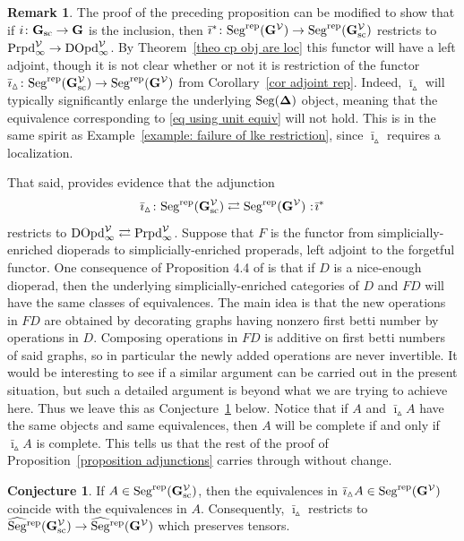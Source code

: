 \documentclass{amsart}
\numberwithin{theorem}{subsection}
\theoremstyle{definition}
\newtheorem{conj}[theorem]{Conjecture}
\newtheorem{remark}[theorem]{Remark}
\newcommand{\xV}{\mathcal{V}}
\newcommand*\cocolon{%
	\nobreak
	\mskip6mu plus1mu
	\mathpunct{}%
	\nonscript
	\mkern-\thinmuskip
	{:}%
	\mskip2mu
	\relax
}
\newcommand{\name}[1]{\ensuremath{\text{\textup{#1}}}}
\newcommand{\simp}{\mathbf{\Delta}}
\newcommand{\bbY}{\mathbf{G}}
\newcommand{\bbYV}{\bbY^{\xV}}
\newcommand{\barinotshriek}{\bar \imath_\vartriangle}
\newcommand{\bariustar}{\bar \imath^*}
\newcommand{\Seg}{\name{Seg}}
\newcommand{\Segrep}{\Seg^{\name{rep}}}
\newcommand{\Segrepc}{\widehat{\Seg}\vphantom{\Seg}^{\name{rep}}}
\newcommand{\nmproperad}{\name{Prpd}}
\begin{document}
\begin{remark}
The proof of the preceding proposition can be modified to show that if $i \colon \bbY_{\name{sc}} \to \bbY$ is the inclusion, then $\bariustar \colon \Segrep(\bbYV) \to \Segrep(\bbYV_{\name{sc}})$ restricts to $\nmproperad_\infty^\xV \to \name{DOpd}^\xV_\infty$.
By Theorem~\ref{theo cp obj are loc} this functor will have a left adjoint, though it is not clear whether or not it is restriction of the functor $\barinotshriek \colon \Segrep(\bbYV_{\name{sc}}) \to \Segrep(\bbYV)$ from Corollary~\ref{cor adjoint rep}.
Indeed, $\barinotshriek$ will typically significantly enlarge the underlying $\Seg(\simp)$ object, meaning that the equivalence corresponding to \eqref{eq using unit equiv} will not hold.
This is in the same spirit as Example~\ref{example: failure of lke restriction}, since $\barinotshriek$ requires a localization. 

That said, \cite[\S4]{HackneyRobertsonYau:SMIP} provides evidence that the adjunction \[ \barinotshriek \colon \Segrep(\bbYV_{\name{sc}}) \rightleftarrows \Segrep(\bbYV) \cocolon \bariustar\] restricts to $\name{DOpd}^\xV_\infty \rightleftarrows \nmproperad_\infty^\xV$.
Suppose that $F$ is the functor from simplicially-enriched dioperads to simplicially-enriched properads, left adjoint to the forgetful functor.
One consequence of Proposition 4.4 of \cite{HackneyRobertsonYau:SMIP} is that if $D$ is a nice-enough dioperad, then the underlying simplicially-enriched categories of $D$ and $FD$ will have the same classes of equivalences.
The main idea is that the new operations in $FD$ are obtained by decorating graphs having nonzero first betti number by operations in $D$.
Composing operations in $FD$ is additive on first betti numbers of said graphs, so in particular the newly added operations are never invertible.
It would be interesting to see if a similar argument can be carried out in the present situation, but such a detailed argument is beyond what we are trying to achieve here.
Thus we leave this as Conjecture~\ref{conjecture equivalences} below.
Notice that if $A$ and $\barinotshriek A$ have the same objects and same equivalences, then $A$ will be complete if and only if $\barinotshriek A$ is complete.
This tells us that the rest of the proof of Proposition~\ref{proposition adjunctions} carries through without change.
\end{remark}

\begin{conj}\label{conjecture equivalences}
If $A \in \Segrep(\bbYV_{\name{sc}})$, then the equivalences in $\barinotshriek A \in \Segrep(\bbYV)$ coincide with the equivalences in $A$.
Consequently, $\barinotshriek$ restricts to $\Segrepc(\bbYV_{\name{sc}}) \to \Segrepc(\bbYV)$ which preserves tensors.
\end{conj}
\end{document}
